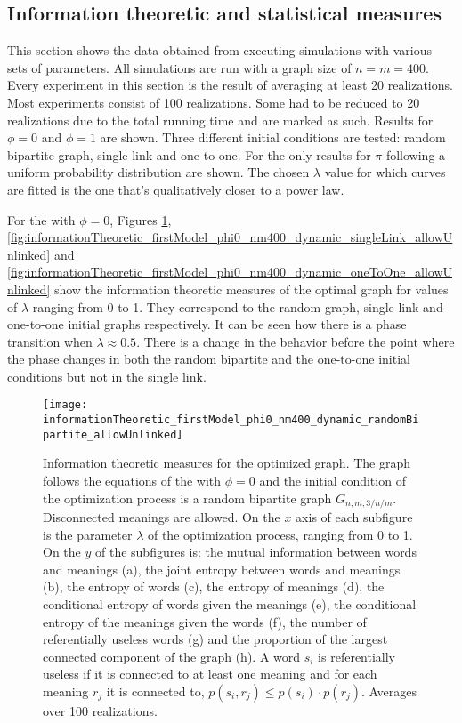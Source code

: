 \subsection{Information theoretic and statistical measures}
\label{sec:results_new_other}

This section shows the data obtained from executing simulations with various sets of parameters.
All simulations are run with a graph size of $n=m=400$.
Every experiment in this section is the result of averaging at least 20 realizations.
Most experiments consist of 100 realizations.
Some had to be reduced to 20 realizations due to the total running time and are marked as such.
Results for $\phi=0$ and $\phi=1$ are shown.
Three different initial conditions are tested: random bipartite graph, single link and one-to-one.
For the \secondmodel{} only results for $\pi$ following a uniform probability distribution are shown.
The chosen $\lambda$ value for which curves are fitted is the one that's qualitatively closer to a power law.

For the \firstmodel{} with $\phi=0$, Figures \ref{fig:informationTheoretic_firstModel_phi0_nm400_dynamic_randomBipartite_allowUnlinked}, \ref{fig:informationTheoretic_firstModel_phi0_nm400_dynamic_singleLink_allowUnlinked} and \ref{fig:informationTheoretic_firstModel_phi0_nm400_dynamic_oneToOne_allowUnlinked} show the information theoretic measures of the optimal graph for values of $\lambda$ ranging from 0 to 1.
They correspond to the random graph, single link and one-to-one initial graphs respectively. It can be seen how there is a phase transition when $\lambda \approx 0.5$.
There is a change in the behavior before the point where the phase changes in both the random bipartite and the one-to-one initial conditions but not in the single link.

\begin{figure}
  \centering
  \texttt{[image: informationTheoretic\_firstModel\_phi0\_nm400\_dynamic\_randomBipartite\_allowUnlinked]}
  \caption{
    Information theoretic measures for the optimized graph.
    The graph follows the equations of the \firstmodel{} with $\phi=0$ and the initial condition of the optimization process is a random bipartite graph $G_{n,m,3/n/m}$. Disconnected meanings are allowed.
    On the $x$ axis of each subfigure is the parameter $\lambda$ of the optimization process, ranging from 0 to 1.
    On the $y$ of the subfigures is: the mutual information between words and meanings (a), the joint entropy between words and meanings (b), the entropy of words (c), the entropy of meanings (d), the conditional entropy of words given the meanings (e), the conditional entropy of the meanings given the words (f), the number of referentially useless words (g) and the proportion of the largest connected component of the graph (h).
    A word $s_i$ is referentially useless if it is connected to at least one meaning and for each meaning $r_j$ it is connected to, $p(s_i,r_j) \leq p(s_i) \cdot p(r_j)$.
    Averages over 100 realizations.
}
  \label{fig:informationTheoretic_firstModel_phi0_nm400_dynamic_randomBipartite_allowUnlinked}
\end{figure}

